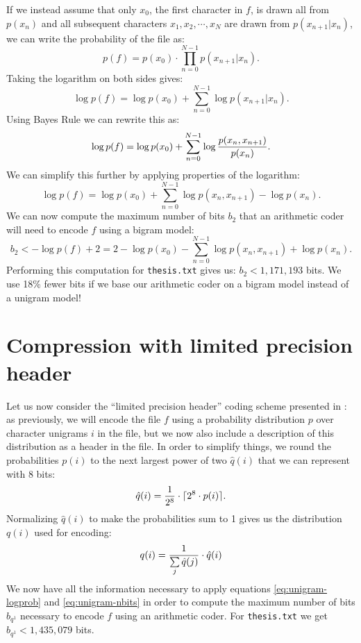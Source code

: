 \documentclass[10pt,a4paper,oneside,onecolumn]{article}
\DeclarePairedDelimiter{\ceil}{\lceil}{\rceil}
\newcommand*{\thesisTXT}{{\tt thesis.txt}\xspace}
\begin{document}
If we instead assume that only $x_0$, the first character in $f$, is drawn all
from $p(x_n)$ and all subsequent characters $x_1, x_2, \cdots, x_N$ are drawn
from $p(x_{n+1} | x_n)$, we can write the probability of the file as:
\begin{equation}
    p(f) = p(x_0) \cdot \prod\limits_{n = 0}^{N - 1} p(x_{n + 1} | x_n).
\end{equation}
Taking the logarithm on both sides gives:
\begin{equation}
    \log p(f) =
    \log p(x_0) + \sum\limits_{n = 0}^{N - 1} \log p(x_{n + 1} | x_n).
\end{equation}
Using Bayes Rule we can rewrite this as:
\begin{equation}
    \log p(f)
    = \log p(x_0)
    + \sum\limits_{n = 0}^{N - 1} \log {p(x_n, x_{n + 1}) \over p(x_n)}.
\end{equation}
We can simplify this further by applying properties of the logarithm:
\begin{equation}\label{eq:bigram-logprob}
    \log p(f)
    = \log p(x_0)
    + \sum\limits_{n = 0}^{N - 1} \log p(x_n, x_{n + 1}) - \log p(x_n).
\end{equation}
We can now compute the maximum number of bits $b_2$ that an arithmetic coder
will need to encode $f$ using a bigram model:
\begin{equation}\label{eq:bigram-nbits}
    b_2 < -\log p(f) + 2
    = 2 - \log p(x_0)
    - \sum\limits_{n = 0}^{N - 1} \log p(x_n, x_{n + 1}) + \log p(x_n).
\end{equation}
Performing this computation for \thesisTXT gives us: $b_2 < 1,171,193$ bits. We
use 18\% fewer bits if we base our arithmetic coder on a bigram model instead of
a unigram model!


\section{Compression with limited precision header}\label{sec:ex4}

Let us now consider the ``limited precision header'' coding scheme presented in
\cite{it-assign}: as previously, we will encode the file $f$ using a probability
distribution $p$ over character unigrams $i$ in the file, but we now also
include a description of this distribution as a header in the file. In order to
simplify things, we round the probabilities $p(i)$ to the next largest power of
two ${\hat q}(i)$ that we can represent with 8 bits:
\begin{equation}
    {\hat q}(i) = {1 \over 2^8} \cdot \ceil{2^8 \cdot p(i)}.
\end{equation}
Normalizing ${\hat q}(i)$ to make the probabilities sum to 1 gives us the
distribution $q(i)$ used for encoding:
\begin{equation}
    q(i) = {1 \over \sum\limits_{j} {\hat q}(j)} \cdot {\hat q}(i)
\end{equation}
We now have all the information necessary to apply equations
\eqref{eq:unigram-logprob} and \eqref{eq:unigram-nbits} in order to compute the
maximum number of bits $b_{q^1}$ necessary to encode $f$ using an arithmetic
coder.  For \thesisTXT we get $b_{q^1} < 1,435,079$ bits.
\end{document}
